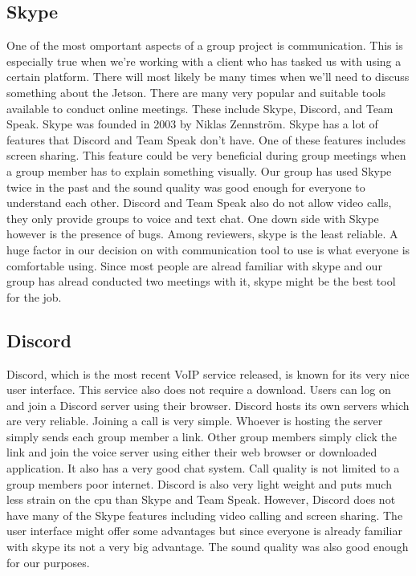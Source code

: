 \subsection{Skype}
One of the most omportant aspects of a group project is communication.
This is especially true when we're working with a client who has tasked us with using a certain platform.
There will most likely be many times when we'll need to discuss something about the Jetson.
There are many very popular and suitable tools available to conduct online meetings.
These include Skype, Discord, and Team Speak.
Skype was founded in 2003 by Niklas Zennström.
Skype has a lot of features that Discord and Team Speak don't have.
One of these features includes screen sharing.
This feature could be very beneficial during group meetings when a group member has to explain something visually.
Our group has used Skype twice in the past and the sound quality was good enough for everyone to understand each other.
Discord and Team Speak also do not allow video calls, they only provide groups to voice and text chat.
One down side with Skype however is the presence of bugs.
Among reviewers, skype is the least reliable.
A huge factor in our decision on with communication tool to use is what everyone is comfortable using.
Since most people are alread familiar with skype and our group has alread conducted two meetings with it, skype might be the best tool for the job.

\subsection{Discord}
Discord, which is the most recent VoIP service released, is known for its very nice user interface.
This service also does not require a download.
Users can log on and join a Discord server using their browser.
Discord hosts its own servers which are very reliable.
Joining a call is very simple.
Whoever is hosting the server simply sends each group member a link.
Other group members simply click the link and join the voice server using either their web browser or downloaded application.
It also has a very good chat system.
Call quality is not limited to a group members poor internet.
Discord is also very light weight and puts much less strain on the cpu than Skype and Team Speak.
However, Discord does not have many of the Skype features including video calling and screen sharing.
The user interface might offer some advantages but since everyone is already familiar with skype its not a very big advantage.
The sound quality was also good enough for our purposes.

